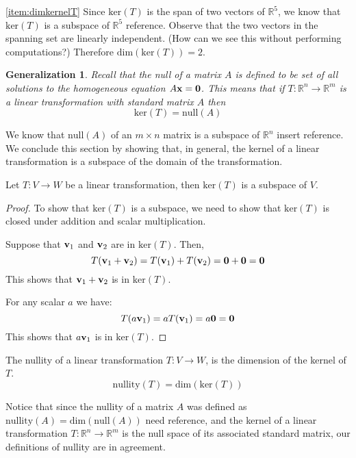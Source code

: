 \documentclass{ximera}
\renewcommand{\vec}[1]{{\bf #1}}
\newcommand{\RR}{\mathbb{R}}
\newcommand{\dfn}{\textit}
\newtheorem{general}{Generalization}
\begin{document}
\begin{example}
\begin{explanation}
\ref{item:dimkernelT}  Since $\text{ker}(T)$ is the span of two vectors of $\RR^5$, we know that $\text{ker}(T)$ is a subspace of $\RR^5$ {\color{red} reference}.  Observe that the two vectors in the spanning set are linearly independent. (How can we see this without performing computations?)  Therefore $\text{dim}(\text{ker}(T))=2$.
\end{explanation}
\end{example}

\begin{general}
Recall that the \dfn{null} of a matrix $A$ is defined to be set of all solutions to the homogeneous equation $A\vec{x}=\vec{0}$. This means that  if $T:\RR^n\rightarrow \RR^m$ is a linear transformation with standard matrix $A$ then
$$\text{ker}(T)=\text{null}(A)$$
\end{general}
We know that $\text{null}(A)$ of an $m\times n$ matrix is a subspace of $\RR^n$ {\color{red} insert reference}.  We conclude this section by showing that, in general, the kernel of a linear transformation is a subspace of the domain of the transformation.
\begin{theorem}\label{th:kersubspace} Let $T:V\rightarrow W$ be a linear transformation, then $\text{ker}(T)$ is a subspace of $V$.
\end{theorem}
\begin{proof}
To show that $\text{ker}(T)$ is a subspace, we need to show that $\text{ker}(T)$ is closed under addition and scalar multiplication.

Suppose that $\vec{v}_1$ and $\vec{v}_2$ are in $\text{ker}(T)$.  Then,
$$T(\vec{v}_1+\vec{v}_2)=T(\vec{v}_1)+T(\vec{v}_2)=\vec{0}+\vec{0}=\vec{0}$$
This shows that $\vec{v}_1+\vec{v}_2$ is in $\text{ker}(T)$.

For any scalar $a$ we have:
$$T(a\vec{v}_1)=aT(\vec{v}_1)=a\vec{0}=\vec{0}$$
This shows that $a\vec{v}_1$ is in $\text{ker}(T)$.

\end{proof}



\begin{definition}\label{def:nullityT}
The nullity of a linear transformation $T:V\rightarrow W$, is the dimension of the kernel of $T$.
$$\text{nullity}(T)=\text{dim}(\text{ker}(T))$$
\end{definition}

Notice that since the nullity of a matrix $A$ was defined as $\text{nullity}(A) = \text{dim}(\text{null}(A))$ {\color{red} need reference}, and the kernel of a linear transformation $T:\RR^n\rightarrow \RR^m$ is the null space of its associated standard matrix, our definitions of nullity are in agreement.
\end{document}
